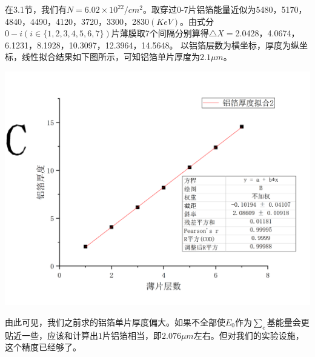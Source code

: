 \documentclass[hyperref]{ctexart}
\begin{document}
\begin{multicols}{2}
	在3.1节，我们有$N=6.02\times 10^{22}/cm^2$。取穿过0-7片铝箔能量近似为5480，5170，4840，4490，4120，3720，3300，2830$(KeV)$。由式\label{DD}分$0-i(i\in \{1,2,3,4,5,6,7\})$片薄膜取7个间隔分别算得$\triangle X=$2.0428，4.0674，6.1231，8.1928，10.3097，12.3964，14.5648。
以铝箔层数为横坐标，厚度为纵坐标，线性拟合结果如下图所示，可知铝箔单片厚度为$2.1\mu m$。
	\begin{center}\includegraphics[scale=0.3]{sk.png}\end{center}

	由此可见，我们之前求的铝箔单片厚度偏大。如果不全部使$E_0$作为${\sum}_e$基能量会更贴近一些，应该和计算出$1$片铝箔相当，即$2.076\mu m$左右。但对我们的实验设施，这个精度已经够了。
\end{multicols}
\end{document}
